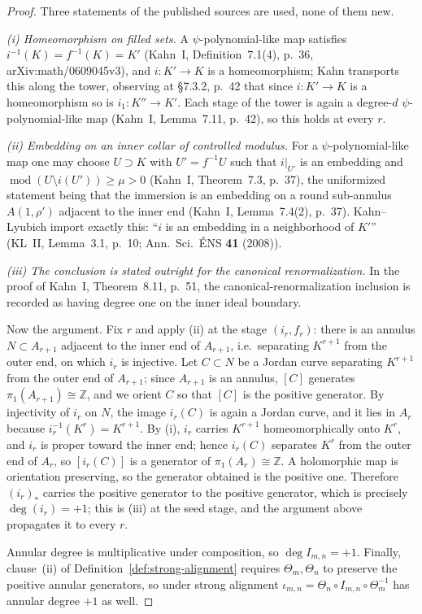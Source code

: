 \begin{proof}
Three statements of the published sources are used, none of them new.

\emph{(i) Homeomorphism on filled sets.}  A \(\psi\)-polynomial-like map satisfies \(i^{-1}(K)=f^{-1}(K)=K'\) (Kahn~I, Definition~7.1(4), p.~36, arXiv:math/0609045v3), and \(i\colon K'\to K\) is a homeomorphism; Kahn transports this along the tower, observing at \S7.3.2, p.~42 that since \(i\colon K'\to K\) is a homeomorphism so is \(i_1\colon K''\to K'\).  Each stage of the tower is again a degree-\(d\) \(\psi\)-polynomial-like map (Kahn~I, Lemma~7.11, p.~42), so this holds at every \(r\).

\emph{(ii) Embedding on an inner collar of controlled modulus.}  For a \(\psi\)-polynomial-like map one may choose \(U\supset K\) with \(U'=f^{-1}U\) such that \(i|_{U'}\) is an embedding and \(\operatorname{mod}(U\setminus i(U'))\ge\mu>0\) (Kahn~I, Theorem~7.3, p.~37), the uniformized statement being that the immersion is an embedding on a round sub-annulus \(A(1,\rho')\) adjacent to the inner end (Kahn~I, Lemma~7.4(2), p.~37).  Kahn--Lyubich import exactly this: ``\(i\) is an embedding in a neighborhood of \(K'\)'' (KL~II, Lemma~3.1, p.~10; Ann.\ Sci.\ \'ENS \textbf{41} (2008)).

\emph{(iii) The conclusion is stated outright for the canonical renormalization.}  In the proof of Kahn~I, Theorem~8.11, p.~51, the canonical-renormalization inclusion is recorded as having degree one on the inner ideal boundary.

Now the argument.  Fix \(r\) and apply (ii) at the stage \((i_r,f_r)\): there is an annulus \(N\subset A_{r+1}\) adjacent to the inner end of \(A_{r+1}\), i.e.\ separating \(K^{r+1}\) from the outer end, on which \(i_r\) is injective.  Let \(C\subset N\) be a Jordan curve separating \(K^{r+1}\) from the outer end of \(A_{r+1}\); since \(A_{r+1}\) is an annulus, \([C]\) generates \(\pi_1(A_{r+1})\cong\mathbb Z\), and we orient \(C\) so that \([C]\) is the positive generator.  By injectivity of \(i_r\) on \(N\), the image \(i_r(C)\) is again a Jordan curve, and it lies in \(A_r\) because \(i_r^{-1}(K^r)=K^{r+1}\).  By (i), \(i_r\) carries \(K^{r+1}\) homeomorphically onto \(K^r\), and \(i_r\) is proper toward the inner end; hence \(i_r(C)\) separates \(K^r\) from the outer end of \(A_r\), so \([i_r(C)]\) is a generator of \(\pi_1(A_r)\cong\mathbb Z\).  A holomorphic map is orientation preserving, so the generator obtained is the positive one.  Therefore \((i_r)_*\) carries the positive generator to the positive generator, which is precisely \(\deg(i_r)=+1\); this is (iii) at the seed stage, and the argument above propagates it to every \(r\).

Annular degree is multiplicative under composition, so \(\deg I_{m,n}=+1\).  Finally, clause~(ii) of Definition~\ref{def:strong-alignment} requires \(\Theta_m,\Theta_n\) to preserve the positive annular generators, so under strong alignment \(\iota_{m,n}=\Theta_n\circ I_{m,n}\circ\Theta_m^{-1}\) has annular degree \(+1\) as well.
\end{proof}

